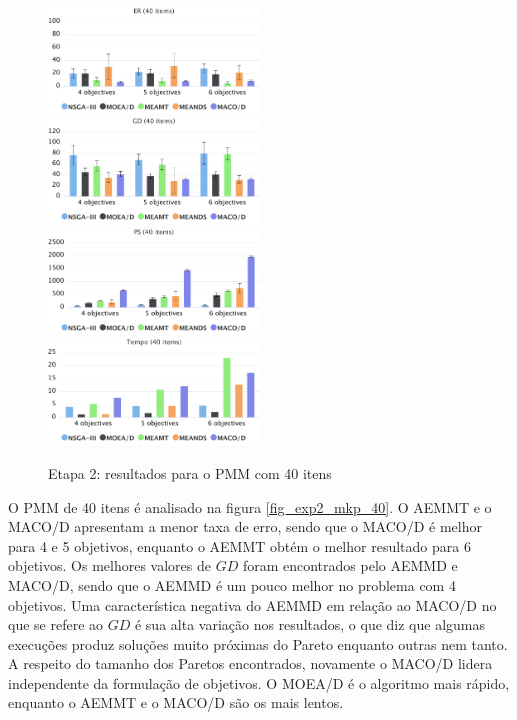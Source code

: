 \begin{figure}[!htbp]
	\caption{Etapa 2: resultados para o PMM com 40 itens}
	\label{fig_exp2_mkp_50}
	\includegraphics[width=0.5\textwidth]{cap_experimentos/figs/etapa2/er-mkp-40}
	\includegraphics[width=0.5\textwidth]{cap_experimentos/figs/etapa2/gd-mkp-40}
	\includegraphics[width=0.5\textwidth]{cap_experimentos/figs/etapa2/ps-mkp-40}
	\includegraphics[width=0.5\textwidth]{cap_experimentos/figs/etapa2/time-mkp-40}
\end{figure}

O PMM de 40 itens é analisado na figura \ref{fig_exp2_mkp_40}. O AEMMT e o MACO/D apresentam a menor taxa de erro, sendo que o MACO/D é melhor para 4 e 5 objetivos, enquanto o AEMMT obtém o melhor resultado para 6 objetivos. Os melhores valores de $GD$ foram encontrados pelo AEMMD e MACO/D, sendo que o AEMMD é um pouco melhor no problema com 4 objetivos. Uma característica negativa do AEMMD em relação ao MACO/D no que se refere ao $GD$ é sua alta variação nos resultados, o que diz que algumas execuções produz soluções muito próximas do Pareto enquanto outras nem tanto. A respeito do tamanho dos Paretos encontrados, novamente o MACO/D lidera independente da formulação de objetivos. O MOEA/D é o algoritmo mais rápido, enquanto o AEMMT e o MACO/D são os mais lentos.

